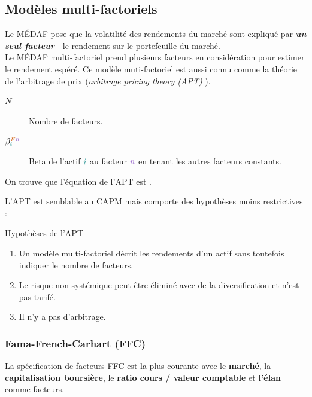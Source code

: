 \documentclass[10pt, french]{article}
\begin{document}
\begin{multicols*}{2}
\columnbreak
\subsection{Modèles multi-factoriels}
\begin{rappel_enhanced}[Contexte]
Le MÉDAF pose que la volatilité des rendements du marché sont expliqué par \textbf{\textit{un seul facteur}}---le rendement sur le portefeuille du marché.\\
Le MÉDAF multi-factoriel prend plusieurs facteurs en considération pour estimer le rendement espéré. Ce modèle muti-factoriel est aussi connu comme la théorie de l'arbitrage de prix (\og \textit{arbitrage pricing theory (APT)} \fg{}).
\end{rappel_enhanced}
\begin{distributions}[Notation]
\begin{description}
	\item[$N$]	Nombre de facteurs.
	\item[$\beta_{{\color{teal}i}}^{{\color{burntorange}F}{\color{amethyst}n}}$]	Beta de l'actif ${\color{teal}i}$ au {\color{burntorange}facteur} ${\color{amethyst}n}$ en tenant les autres facteurs constants.
\end{description}
\end{distributions}
On trouve que l'équation de l'APT est .

L'APT est semblable au CAPM mais comporte des hypothèses moins restrictives :
\begin{conceptgen}{Hypothèses de l'APT}
\begin{enumerate}
	\item	Un modèle multi-factoriel décrit les rendements d'un actif sans toutefois indiquer le nombre de facteurs.
	\item	Le risque non systémique peut être éliminé avec de la diversification et n'est pas tarifé.
	\item	Il n'y a pas d'arbitrage.
\end{enumerate}
\end{conceptgen}


\subsubsection{Fama-French-Carhart (FFC)}
\begin{definitionNOHFILL}[Notation]
La spécification de facteurs FFC est la plus courante avec le \textbf{marché}, la \textbf{capitalisation boursière}, le \textbf{ratio cours / valeur comptable} et \textbf{l'élan} comme facteurs.


\end{definitionNOHFILL}
\end{multicols*}
\end{document}
